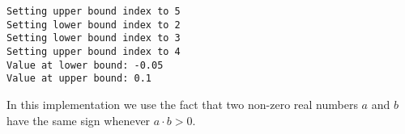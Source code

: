 \documentclass[10pt]{scrartcl}
\begin{document}
    \begin{Verbatim}[commandchars=\\\{\}]
Setting upper bound index to 5
Setting lower bound index to 2
Setting lower bound index to 3
Setting upper bound index to 4
Value at lower bound: -0.05
Value at upper bound: 0.1
    \end{Verbatim}

    In this implementation we use the fact that two non-zero real numbers
\(a\) and \(b\) have the same sign whenever \(a \cdot b > 0\).


    
    
    
\end{document}
